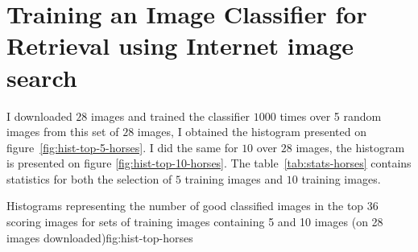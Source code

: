 \documentclass{article}
\begin{document}






\section{Training an Image Classifier for Retrieval using Internet image search}


I downloaded $28$ images and trained the classifier $1000$ times over
5 random images from this set of $28$ images, I obtained the histogram
presented on figure~\ref{fig:hist-top-5-horses}. I did the same for
$10$ over $28$ images, the histogram is presented on figure
\ref{fig:hist-top-10-horses}. The table~\ref{tab:stats-horses} contains
statistics for both the selection of $5$ training images and $10$
training images.

\doublefig
{}
{}
{ Histograms representing the number of good classified images in the
  top 36 scoring images for sets of training images containing 5 and
  10 images (on 28 images downloaded)}{fig:hist-top-horses}
\end{document}
